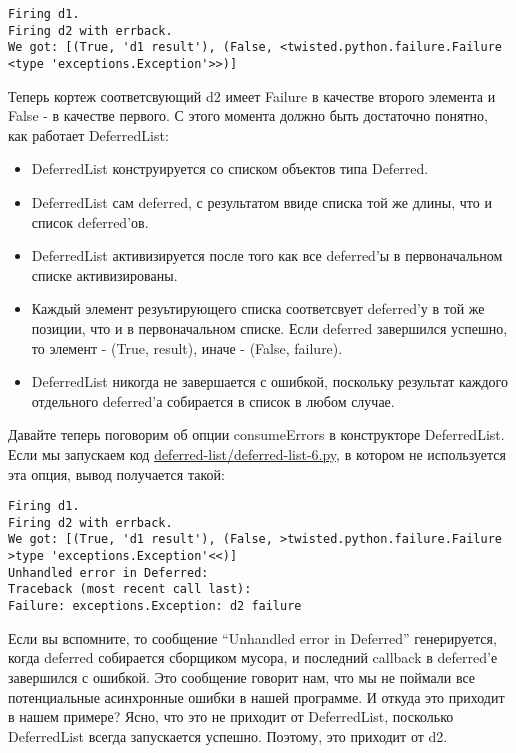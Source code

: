  \begin{verbatim}
Firing d1.
Firing d2 with errback.
We got: [(True, 'd1 result'), (False, <twisted.python.failure.Failure <type 'exceptions.Exception'>>)]
\end{verbatim} 

Теперь кортеж соответсвующий d2 имеет Failure в качестве второго элемента и 
False - в качестве первого. С этого момента должно быть достаточно понятно, как 
работает DeferredList:

\begin{itemize}

\item DeferredList конструируется со списком объектов типа Deferred.

\item DeferredList сам deferred, с результатом ввиде списка той же длины, что и список deferred'ов.

\item DeferredList активизируется после того как все deferred'ы в первоначальном 
    списке активизированы.

\item Каждый элемент резуьтирующего списка соответсвует 
    deferred'у в той же позиции, что и в первоначальном списке. Если 
    deferred завершился успешно, то элемент - (True, result), 
    иначе - (False, failure).

\item DeferredList никогда не завершается с ошибкой, поскольку 
    результат каждого отдельного deferred'а собирается в список 
    в любом случае.
\end{itemize}


Давайте теперь поговорим об опции consumeErrors в 
конструкторе DeferredList. Если мы запускаем код 
\href{http://github.com/jdavisp3/twisted-intro/blob/master/deferred-list/deferred-list-6.py#L1}{deferred-list/deferred-list-6.py}, в котором не используется эта опция, вывод получается такой:


 \begin{verbatim}
Firing d1.
Firing d2 with errback.
We got: [(True, 'd1 result'), (False, >twisted.python.failure.Failure >type 'exceptions.Exception'<<)]
Unhandled error in Deferred:
Traceback (most recent call last):
Failure: exceptions.Exception: d2 failure
\end{verbatim} 


Если вы вспомните, то сообщение ``Unhandled error in Deferred'' 
генерируется, когда deferred собирается сборщиком мусора, и 
последний callback в deferred'е завершился с ошибкой. Это сообщение 
говорит нам, что мы не поймали все потенциальные асинхронные 
ошибки в нашей программе. И откуда это приходит в нашем примере? 
Ясно, что это не приходит от DeferredList, посколько DeferredList 
всегда запускается успешно. Поэтому, это приходит от d2.


